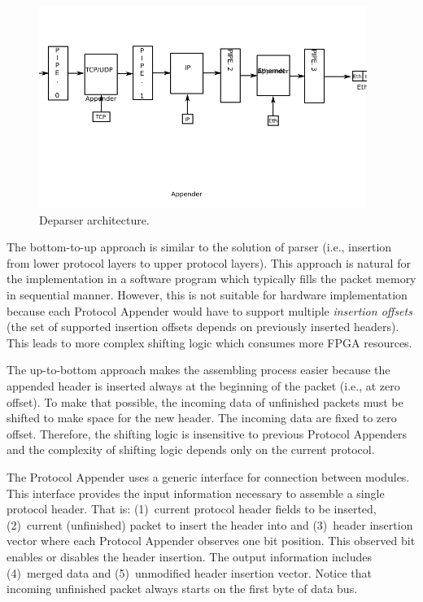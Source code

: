 \begin{figure}[ht]
    \centering
    \includegraphics[width=0.95\textwidth]{chapters/pic/DeparserTop}
    \caption{Deparser architecture.}
    \label{fig:deparserArch}
\end{figure}

The bottom-to-up approach is similar to the solution of parser (i.e., insertion from lower protocol layers to upper protocol layers). 
This approach is natural for the implementation in a software program which typically fills the packet memory in sequential manner.
However, this is not suitable for hardware implementation because each Protocol Appender would have to support multiple \emph{insertion offsets} 
(the set of supported insertion offsets depends on previously inserted headers). 
This leads to more complex shifting logic which consumes more FPGA resources.

The up-to-bottom approach makes the assembling process easier because 
the appended header is inserted always at the beginning of the packet (i.e., at zero offset).
To make that possible, the incoming data of unfinished packets must be shifted to make space for the new header.
The incoming data are fixed to zero offset. 
Therefore, the shifting logic is insensitive to previous Protocol Appenders and the complexity of shifting logic depends only on the current protocol.

The Protocol Appender uses a generic interface for connection between modules. This interface provides the input information 
necessary to assemble a single protocol header. That is: (1)~current protocol header fields to be inserted, (2)~current (unfinished) packet 
to insert the header into and  (3)~header insertion vector where each Protocol Appender observes one bit position. 
This observed bit enables or disables the header insertion. 
The output information includes (4)~merged data and (5)~unmodified header insertion vector.
Notice that incoming unfinished packet always starts on the first byte of data bus.

